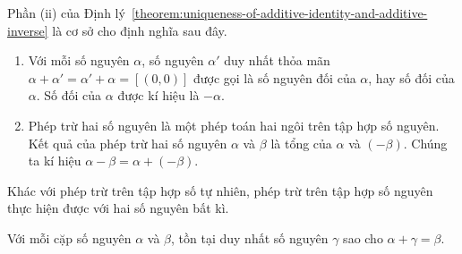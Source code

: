 Phần (ii) của Định lý~\ref{theorem:uniqueness-of-additive-identity-and-additive-inverse} là cơ sở cho định nghĩa sau đây.
\begin{definition}
	\begin{enumerate}[label={(\roman*)}]
		\item Với mỗi số nguyên $\alpha$, số nguyên $\alpha'$ duy nhất thỏa mãn $\alpha + \alpha' = \alpha' + \alpha = [(0, 0)]$ được gọi là số nguyên đối của $\alpha$, hay số đối của $\alpha$. Số đối của $\alpha$ được kí hiệu là $-\alpha$.
		\item Phép trừ hai số nguyên là một phép toán hai ngôi trên tập hợp số nguyên. Kết quả của phép trừ hai số nguyên $\alpha$ và $\beta$ là tổng của $\alpha$ và $(-\beta)$. Chúng ta kí hiệu $\alpha - \beta = \alpha + (-\beta)$.
	\end{enumerate}
\end{definition}

Khác với phép trừ trên tập hợp số tự nhiên, phép trừ trên tập hợp số nguyên thực hiện được với hai số nguyên bất kì.

\begin{theorem}\label{theorem:foundation-of-integer-subtraction}
	Với mỗi cặp số nguyên $\alpha$ và $\beta$, tồn tại duy nhất số nguyên $\gamma$ sao cho $\alpha + \gamma = \beta$.
\end{theorem}

